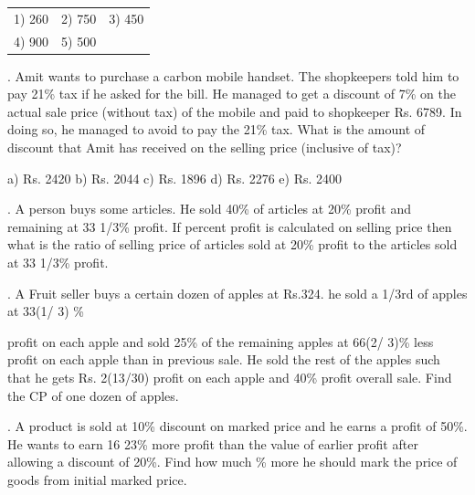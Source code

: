 \documentclass{article}
\begin{document}
	\noindent  
	\begin{tabular}{p{1.7in} p{1.6in} p{1.6in}} \\ 
 1) 260                      & 2) 750               & 3) 450               \\
4) 900               & 5) 500 \\
\end{tabular}
	
	\noindent 
	
	\noindent 
	
	\noindent 
	
	. Amit wants to purchase a carbon mobile handset. The shopkeepers told him to pay 21\% tax if he asked for the bill. He managed to get a discount of 7\% on the actual sale price (without tax) of the mobile and paid to shopkeeper Rs. 6789. In doing so, he managed to avoid to pay the 21\% tax. What is the amount of discount that Amit has received on the selling price (inclusive of tax)?
	
	\noindent a) Rs. 2420             b) Rs. 2044       c) Rs. 1896       d) Rs. 2276      e) Rs. 2400
	
	\noindent 
	
	\noindent 
	
	. A person buys some articles. He sold 40\% of articles at 20\% profit and remaining at 33 1/3\% profit. If percent profit is calculated on selling price then what is the ratio of selling price of articles sold at 20\% profit to the articles sold at 33 1/3\% profit.
	
	\noindent 
	
	\noindent 
	
	. A Fruit seller buys a certain dozen of apples at Rs.324. he sold a 1/3rd of apples at 33(1/ 3) \%
	
	\noindent 
	
	\noindent profit on each apple and sold 25\% of the remaining apples at 66(2/ 3)\% less profit on each apple than in previous sale. He sold the rest of the apples such that he gets Rs. 2(13/30) profit on each apple and 40\% profit overall sale. Find the CP of one dozen of apples.
	
	\noindent 
	
	\noindent 
	
	. A product is sold at 10\% discount on marked price and he earns a profit of 50\%. He wants to earn 16 23\% more profit than the value of earlier profit after allowing a discount of 20\%. Find how much \% more he should mark the price of goods from initial marked price.
	
\end{document}
